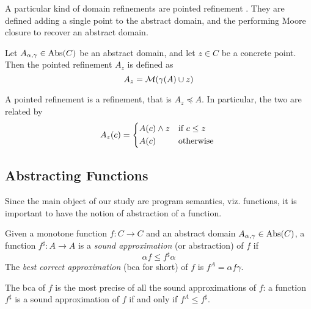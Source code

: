A particular kind of domain refinements are pointed refinement \cite{BGGR22}. They are defined adding a single point to the abstract domain, and the performing Moore closure to recover an abstract domain.
\begin{definition}
	Let $A_{\alpha, \gamma} \in \text{\normalfont Abs}(C)$ be an abstract domain, and let $z \in C$ be a concrete point. Then the pointed refinement $A_z$ is defined as
	\[
	A_z = \mathcal{M}(\gamma(A) \cup z)
	\]
\end{definition}
A pointed refinement is a refinement, that is $A_z \preceq A$. In particular, the two are related by
\[
A_z(c) = \begin{cases*}
	A(c) \wedge z &if $c \le z$ \\
	A(c) &otherwise
\end{cases*}
\]

\subsection{Abstracting Functions}
Since the main object of our study are program semantics, viz. functions, it is important to have the notion of abstraction of a function.
\begin{definition}
	Given a monotone function $f : C \rightarrow C$ and an abstract domain $A_{\alpha, \gamma} \in \text{\normalfont Abs}(C)$, a function $f^{\sharp} : A \rightarrow A$ is a \emph{sound approximation} (or abstraction) of $f$ if
	\[
	\alpha f \le f^{\sharp} \alpha
	\]
	The \emph{best correct approximation} (bca for short) of $f$ is $f^{A} = \alpha f \gamma$.
\end{definition}
The bca of $f$ is the most precise of all the sound approximations of $f$: a function $f^{\sharp}$ is a sound approximation of $f$ if and only if $f^{A} \le f^{\sharp}$.

